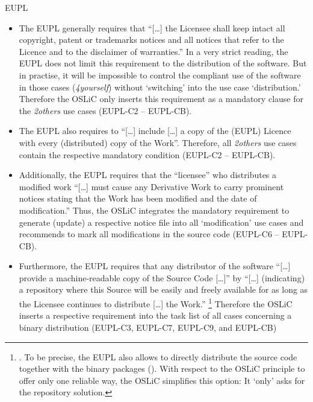 \begin{license}{EUPL}
\begin{itemize}
\item The EUPL generally requires that \enquote{[\ldots] the Licensee shall
  keep intact all copyright, patent or trademarks notices and all notices that
  refer to the Licence and to the disclaimer of warranties.} 
  In a very strict reading, the EUPL does not limit this requirement to the
  distribution of the software. But in practise, it will be impossible to
  control the compliant use of the software in those cases (\emph{4yourself})
  without `switching' into the use case `distribution.' Therefore the OSLiC only
  inserts this requirement as a mandatory clause for the \emph{2others} use
  cases (EUPL-C2 -- EUPL-CB). 
  
\item The EUPL also requires to \enquote{[\ldots] include [\ldots] a copy of
  the (EUPL) Licence with every (distributed) copy of the Work}.
  Therefore, all \emph{2others} use cases contain the respective mandatory
  condition (EUPL-C2 -- EUPL-CB).
  
\item Additionally, the EUPL requires that the \enquote{licensee} who
  distributes a modified work \enquote{[\ldots] must cause any Derivative Work 
  to carry prominent notices stating that the Work has been modified and the
  date of modification.} 
  Thus, the OSLiC integrates the mandatory requirement to generate (update) a
  respective notice file into all `modification' use cases and recommends to mark
  all modifications in the source code (EUPL-C6 -- EUPL-CB).
  
\item Furthermore, the EUPL requires that any distributor of the software
  \enquote{[\ldots] provide a machine-readable copy of the Source Code [\ldots]}
  by \enquote{[\ldots] (indicating) a repository where this Source will be
  easily and freely available for as long as the Licensee continues to
  distribute [\ldots] the Work.}%
  \footnote{\cite[cf.][\nopage wp.\ §5]{EuplLicense2007en}. To be precise, the
    EUPL also allows to directly distribute the source code together with the
    binary packages (\cite[cf.][\nopage wp.\ §3]{EuplLicense2007en}). With
    respect to the OSLiC principle to offer only one reliable way, the OSLiC
    simplifies this option: It `only' asks for the repository solution.} 
  Therefore the OSLiC inserts a respective requirement into the task list of all
  cases concerning a binary distribution (EUPL-C3, EUPL-C7, EUPL-C9, and EUPL-CB)
  

\end{itemize}
\end{license}

